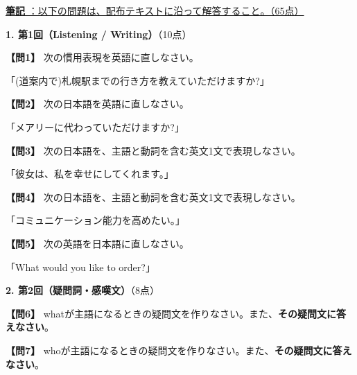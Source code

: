 \underline{\large\noindent\textbf{筆記} ：以下の問題は、配布テキストに沿って解答すること。（65点）}
\vspace{0.35em}
\testsectsep

\noindent\textbf{1. 第1回（Listening / Writing）}（10点）

\testquestion
\noindent\textbf{【問1】} 次の慣用表現を英語に直しなさい。

\noindent「(道案内で)札幌駅までの行き方を教えていただけますか?」

\testqsep

\testquestion
\noindent\textbf{【問2】} 次の日本語を英語に直しなさい。

\noindent「メアリーに代わっていただけますか?」

\testqsep

\testquestion
\noindent\textbf{【問3】} 次の日本語を、主語と動詞を含む英文1文で表現しなさい。

\noindent「彼女は、私を幸せにしてくれます。」

\testqsep

\testquestion
\noindent\textbf{【問4】} 次の日本語を、主語と動詞を含む英文1文で表現しなさい。

\noindent「コミュニケーション能力を高めたい。」

\testqsep

\testquestion
\noindent\textbf{【問5】} 次の英語を日本語に直しなさい。

\noindent「What would you like to order?」

\testqsep

\newpage
\testsectsep
\noindent\textbf{2. 第2回（疑問詞・感嘆文）}（8点）

\testquestion
\noindent\textbf{【問6】} whatが主語になるときの疑問文を作りなさい。また、\textbf{その疑問文に答えなさい}。

\vspace{0.5em}
\testqsep

\testquestion
\noindent\textbf{【問7】} whoが主語になるときの疑問文を作りなさい。また、\textbf{その疑問文に答えなさい}。

\vspace{0.5em}
\testqsep

